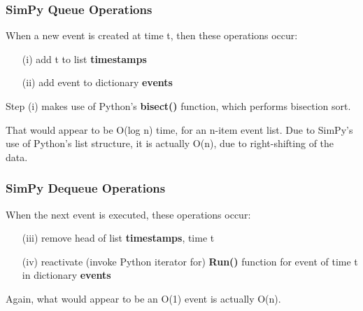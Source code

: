 \documentclass{beamer}
\begin{document}
\begin{frame}[fragile]
\frametitle{SimPy Queue Operations}

\pause

When a new event is created at time t, then these operations
occur:

\begin{itemize}
 
\item [(i)] add t to list {\bf timestamps}
\item [(ii)] add event to dictionary {\bf events}  

\end{itemize}

\pause

Step (i) makes use of Python's {\bf bisect()} function, which performs
bisection sort.

\pause

That would appear to be O(log n) time, for an n-item event list.  Due to
SimPy's use of Python's list structure, it is actually O(n), due to
right-shifting of the data.

\end{frame}

\begin{frame}[fragile]
\frametitle{SimPy Dequeue Operations}

\pause

When the next event is executed, these operations occur:

\begin{itemize}

\item [(iii)] remove head of list {\bf timestamps}, time t

\item [(iv)] reactivate (invoke Python iterator for) {\bf Run()} function
for event of time t in dictionary {\bf events}  

\end{itemize}

\pause

Again, what would appear to be an O(1) event is actually O(n).

\end{frame}
\end{document}

